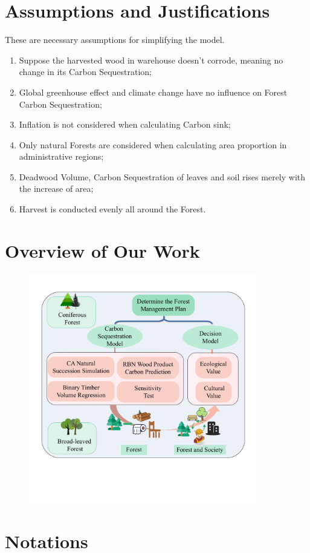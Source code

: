 \documentclass{mcmthesis}
\numberwithin{figure}{section}
\numberwithin{table}{section}
\numberwithin{equation}{section}
\begin{document}
\section{Assumptions and Justifications}
These are necessary assumptions for simplifying the model.
\begin{enumerate}
  \item Suppose the harvested wood in warehouse doesn't corrode, meaning no change in its Carbon Sequestration;
  \item Global greenhouse effect and climate change have no influence on Forest Carbon Sequestration;
  \item Inflation is not considered when calculating Carbon sink;
  \item Only natural Forests are considered when calculating area proportion in administrative regions;
  \item Deadwood Volume, Carbon Sequestration of leaves and soil rises merely with the increase of area;
  \item Harvest is conducted evenly all around the Forest.
\end{enumerate}
\section{Overview of Our Work}

\begin{figure}[htbp]
  \centering
  \includegraphics[width = 10cm]{code&pic/框架图.pdf}
\end{figure}

\section{Notations}
\end{document}
